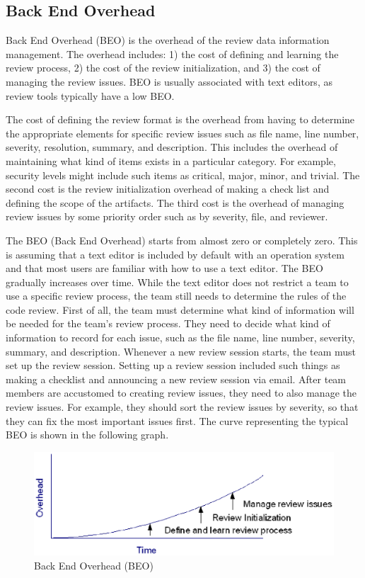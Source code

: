 \subsection{Back End Overhead}
\label{subsec:back-end-overhead}

Back End Overhead (BEO) is the overhead of the review data information management. The overhead includes: 1) the cost of defining and learning the review process, 2) the cost of the review initialization, and 3) the cost of managing the review issues. BEO is usually associated with text editors, as review tools typically have a low BEO.

The cost of defining the review format is the overhead from having to determine the appropriate elements for specific review issues such as file name, line number, severity, resolution, summary, and description. This includes the overhead of maintaining what kind of items exists in a particular category. For example, security levels might include such items as critical, major, minor, and trivial. The second cost is the review initialization overhead of making a check list and defining the scope of the artifacts. The third cost is the overhead of managing review issues by some priority order such as by severity, file, and reviewer.

The BEO (Back End Overhead) starts from almost zero or completely zero.  This is assuming that a text editor is included by default with an operation system and that most users are familiar with how to use a text editor. The BEO gradually increases over time. While the text editor does not restrict a team to use a specific review process, the team still needs to determine the rules of the code review. First of all, the team must determine what kind of information will be needed for the team's review process. They need to decide what kind of information to record for each issue, such as the file name, line number, severity, summary, and description. Whenever a new review session starts, the team must set up the review session. Setting up a review session included such things as making a checklist and announcing a new review session via email. After team members are accustomed to creating review issues, they need to also manage the review issues. For example, they should sort the review issues by severity, so that they can fix the most important issues first. The curve representing the typical BEO is shown in the following graph. 

\begin{figure}[htbp]
  \centering
  \includegraphics{images/fig1-2.eps}
  \caption{Back End Overhead (BEO)}
  \label{fig1-2}
\end{figure}
 
